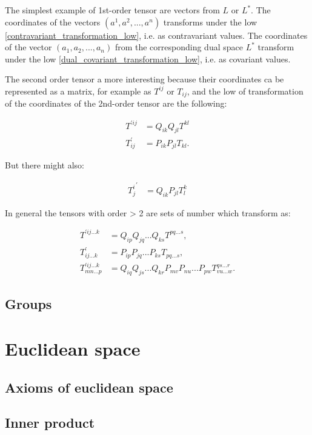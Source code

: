 \documentclass{book}
\begin{document}
The simplest example of 1st-order tensor are vectors from $L$ or $L^*$. The coordinates of the vectors $(a^1, a^2, ..., a^n)$ transforms under the low \eqref{contravariant_transformation_low}, i.e. as contravariant values. The coordinates of the vector $(a_1, a_2, ..., a_n)$ from the corresponding dual space $L^*$ transform under the low \eqref{dual_covariant_transformation_low}, i.e. as covariant values.

The second order tensor a more interesting because their coordinates ca be represented as a matrix, for example as $T^{ij}$ or $T_{ij}$, and the low of transformation of the coordinates of the 2nd-order tensor are the following:

\begin{align}
{T^{'ij}} &= Q_{ik}Q_{jl}T^{kl} \\
T^{'}_{ij} &= P_{ik}P_{jl}T_{kl}.
\end{align}

But there might also:

\begin{align}
{T^{i}_{j}}^{'} &= Q_{ik}P_{jl}T^{k}_{l} 
\end{align}

In general the tensors with order > 2 are sets of number which transform as:

\begin{align}
T^{'ij...k} &= Q_{ip}Q_{jq}...Q_{ks}T^{pq...s}, \\
T^{'}_{ij...k} &= P_{ip}P_{jq}...P_{ks}T_{pq...s}, \\
T^{'ij...k}_{mn...p} &= Q_{iq}Q_{js}...Q_{kr}P_{mv}P_{nu}...P_{pw}T^{qs...r}_{vu...w}.
\end{align}

\section{Groups}

\chapter{Euclidean space}

\section{Axioms of euclidean space}

\section{Inner product}
\end{document}
